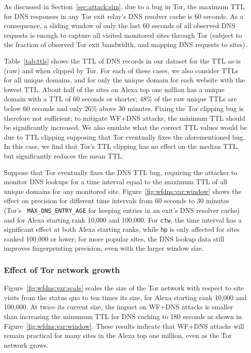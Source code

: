 As discussed in Section~\ref{sec:attack:sim}, due to a bug in Tor, the
maximum TTL for DNS responses in any Tor exit relay's DNS resolver cache
is 60 seconds. As a consequence, a sliding window of only the last 60
seconds of all observed DNS requests is enough to capture all visited
monitored sites through Tor (subject to the fraction of observed Tor
exit bandwidth, and mapping DNS requests to sites).

Table~\ref{tab:ttls} shows the TTL of DNS records in our dataset for the
TTL as-is (raw) and when clipped by Tor.  For each of these cases, we
also consider TTLs for all unique domains, and for only the unique
domain for each website with the lowest TTL.  About half of the sites on
Alexa top one million has a unique domain with a TTL of 60 seconds or
shorter; 48\% of the raw unique TTLs are below 60 seconds and only 26\%
above 30 minutes. Fixing the Tor clipping bug is therefore not
sufficient; to mitigate WF+DNS attacks, the minimum TTL should be 
significantly increased.  We also emulate what the correct TTL values
would be due to TTL clipping supposing that Tor eventually fixes the
aforementioned bug.  In this case, we find that Tor's TTL clipping has
no effect on the median TTL, but significantly reduces the mean TTL.

Suppose that Tor eventually fixes the DNS TTL bug, requiring the
attacker to monitor DNS lookups for a time interval equal to the maximum
TTL of all unique domains for any monitored site.
Figure~\ref{fig:wfdns:var:window} shows the effect on precision for
different time intervals from 60 seconds to 30 minutes (Tor's {\tt
  MAX\_DNS\_ENTRY\_AGE} for keeping entries in an exit's DNS resolver
cache) and for Alexa starting rank 10,000 and 100,000. For \texttt{ctw},
the time interval has a significant effect at both Alexa starting ranks,
while \texttt{hp} is only affected for sites ranked 100,000 or lower;
for more popular sites, the DNS lookup data still improves
fingerprinting precision, even with the larger window size.

\subsubsection{Effect of Tor network growth}
Figure~\ref{fig:wfdns:var:scale} scales the size of the Tor network with
respect to site
visits from the status quo to ten times its size, for Alexa starting rank 10,000 and
100,000. At twice its current size, the impact on WF+DNS attacks is smaller than
increasing the minumum TTL for DNS caching to 180 seconds as shown in
Figure~\ref{fig:wfdns:var:window}. These results indicate that WF+DNS
attacks will remain
practical for many sites in the Alexa top one million, even as the Tor network grows.

